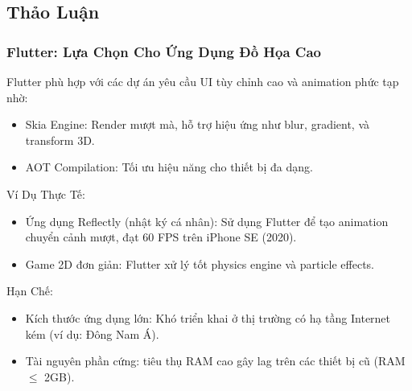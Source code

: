\subsection{Thảo Luận}
\renewcommand{\labelitemi}{--}    
\subsubsection{Flutter: Lựa Chọn Cho Ứng Dụng Đồ Họa Cao}
\begin{flushleft}
  \hspace*{0.8cm}Flutter phù hợp với các dự án yêu cầu UI tùy chỉnh cao và animation phức tạp nhờ:
  \setlength{\leftmargini}{1.5cm}
  \begin{itemize}
    \item Skia Engine: Render mượt mà, hỗ trợ hiệu ứng như blur, gradient, và transform 3D.
    \item AOT Compilation: Tối ưu hiệu năng cho thiết bị đa dạng.
  \end{itemize}
\end{flushleft}

\begin{flushleft}
  \hspace*{0.8cm}Ví Dụ Thực Tế:
  \setlength{\leftmargini}{1.5cm}
  \begin{itemize}
      \item Ứng dụng Reflectly (nhật ký cá nhân): Sử dụng Flutter để tạo animation chuyển cảnh mượt, đạt 60 FPS trên iPhone SE (2020).
      \item Game 2D đơn giản: Flutter xử lý tốt physics engine và particle effects.
  \end{itemize}
\end{flushleft}

\begin{flushleft}
  \hspace*{0.8cm}Hạn Chế:
  \setlength{\leftmargini}{1.5cm}
  \begin{itemize}
      \item Kích thước ứng dụng lớn: Khó triển khai ở thị trường có hạ tầng Internet kém (ví dụ: Đông Nam Á).
      \item Tài nguyên phần cứng: tiêu thụ RAM cao gây lag trên các thiết bị cũ (RAM $\leq$ 2GB).
  \end{itemize}
\end{flushleft}


